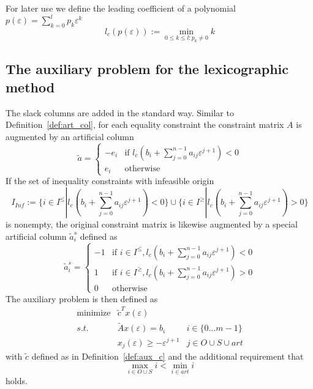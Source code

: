 \documentclass[a4paper]{article}
\begin{document}
For later use we define the leading coefficient of a polynomial 
$p(\varepsilon)=\sum_{k=0}^{l}p_{k}\varepsilon^{k}$
\begin{equation}
\label{def:lead_coeff}
l_{c}(p(\varepsilon)):=\min_{0 \leq k \leq l:p_{k} \neq 0}k 
\end{equation}
  
\subsection{The auxiliary problem for the lexicographic method}
The slack columns are added in the standard way.
Similar to Definition~\ref{def:art_col}, for each equality constraint the
constraint matrix $A$ is augmented by an artificial column
\[
 \tilde{a} =\left\{
	      \begin{array}{ll}
  		-e_{i} &
		 \mbox{if $l_{c}\left(
		  b_{i} + \sum_{j=0}^{n-1}a_{ij}\varepsilon^{j+1}\right)< 0$}\\
		  e_{i}  & \mbox{otherwise}
	      \end{array}
 	     \right.
\]
If the set of inequality constraints with infeasible origin
\[
  I_{Inf}:=\{i \in I^{\leq}\left|\right. l_{c}\left(b_{i} +
    \sum_{j=0}^{n-1}a_{ij}\varepsilon^{j+1}\right) < 0\} \cup
    \{i \in I^{\geq}\left|\right. l_{c}\left(b_{i} +
    \sum_{j=0}^{n-1}a_{ij}\varepsilon^{j+1}\right) > 0\}
\]
is nonempty, the original constraint matrix is likewise augmented by a special
artificial column $\tilde{a}_{i}^{s}$ defined as
\begin{equation}
\tilde{a}^{s}_{i} =\left\{
	             \begin{array}{ll}
  		       -1 & \mbox{if $i \in I^{\leq},
			l_{c}\left(b_{i} +
			 \sum_{j=0}^{n-1}a_{ij}\varepsilon^{j+1}\right) < 0$}\\
		        1 & \mbox{if $i \in I^{\geq},
			l_{c}\left(b_{i} +
			  \sum_{j=0}^{n-1}a_{ij}\varepsilon^{j+1}\right)> 0$}\\
		        0 & \mbox{otherwise}
	             \end{array}
 	           \right.
\end{equation}
The auxiliary problem is then defined as
\begin{eqnarray}
\label{def:aux_prob}
 \mbox{minimize} &  \tilde{c}^{T}x(\varepsilon)   & 	  \nonumber \\
	s.t.	 & \tilde{A}x(\varepsilon) = b_{i} & i \in \{0\ldots m-1\}  \\
		 & x_{j}(\varepsilon) \geq -\varepsilon^{j+1} &
		   j \in O \cup S \cup art \nonumber 
\end{eqnarray}
with $\tilde{c}$ defined as in Definition~\ref{def:aux_c} and the additional
requirement that 
\begin{equation}
\label{req:order_eps}
\max_{i \in O \cup S}i < \min_{i \in art}i
\end{equation} 
holds.
\end{document}
